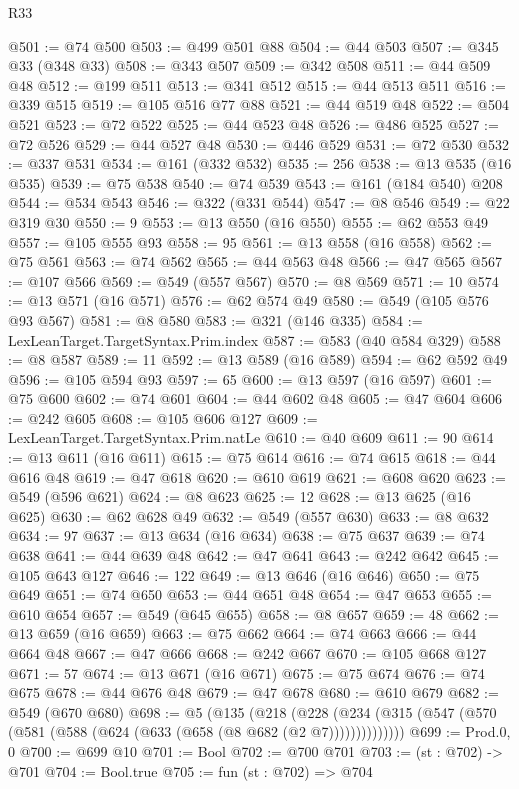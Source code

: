 \begin{lexlean}{R33}
\begin{coremodule}
@501 := @74 @500
@503 := @499 @501 @88
@504 := @44 @503
@507 := @345 @33 (@348 @33)
@508 := @343 @507
@509 := @342 @508
@511 := @44 @509 @48
@512 := @199 @511
@513 := @341 @512
@515 := @44 @513 @511
@516 := @339 @515
@519 := @105 @516 @77 @88
@521 := @44 @519 @48
@522 := @504 @521
@523 := @72 @522
@525 := @44 @523 @48
@526 := @486 @525
@527 := @72 @526
@529 := @44 @527 @48
@530 := @446 @529
@531 := @72 @530
@532 := @337 @531
@534 := @161 (@332 @532)
@535 := 256
@538 := @13 @535 (@16 @535)
@539 := @75 @538
@540 := @74 @539
@543 := @161 (@184 @540) @208
@544 := @534 @543
@546 := @322 (@331 @544)
@547 := @8 @546
@549 := @22 @319 @30
@550 := 9
@553 := @13 @550 (@16 @550)
@555 := @62 @553 @49
@557 := @105 @555 @93
@558 := 95
@561 := @13 @558 (@16 @558)
@562 := @75 @561
@563 := @74 @562
@565 := @44 @563 @48
@566 := @47 @565
@567 := @107 @566
@569 := @549 (@557 @567)
@570 := @8 @569
@571 := 10
@574 := @13 @571 (@16 @571)
@576 := @62 @574 @49
@580 := @549 (@105 @576 @93 @567)
@581 := @8 @580
@583 := @321 (@146 @335)
@584 := LexLeanTarget.TargetSyntax.Prim.index
@587 := @583 (@40 @584 @329)
@588 := @8 @587
@589 := 11
@592 := @13 @589 (@16 @589)
@594 := @62 @592 @49
@596 := @105 @594 @93
@597 := 65
@600 := @13 @597 (@16 @597)
@601 := @75 @600
@602 := @74 @601
@604 := @44 @602 @48
@605 := @47 @604
@606 := @242 @605
@608 := @105 @606 @127
@609 := LexLeanTarget.TargetSyntax.Prim.natLe
@610 := @40 @609
@611 := 90
@614 := @13 @611 (@16 @611)
@615 := @75 @614
@616 := @74 @615
@618 := @44 @616 @48
@619 := @47 @618
@620 := @610 @619
@621 := @608 @620
@623 := @549 (@596 @621)
@624 := @8 @623
@625 := 12
@628 := @13 @625 (@16 @625)
@630 := @62 @628 @49
@632 := @549 (@557 @630)
@633 := @8 @632
@634 := 97
@637 := @13 @634 (@16 @634)
@638 := @75 @637
@639 := @74 @638
@641 := @44 @639 @48
@642 := @47 @641
@643 := @242 @642
@645 := @105 @643 @127
@646 := 122
@649 := @13 @646 (@16 @646)
@650 := @75 @649
@651 := @74 @650
@653 := @44 @651 @48
@654 := @47 @653
@655 := @610 @654
@657 := @549 (@645 @655)
@658 := @8 @657
@659 := 48
@662 := @13 @659 (@16 @659)
@663 := @75 @662
@664 := @74 @663
@666 := @44 @664 @48
@667 := @47 @666
@668 := @242 @667
@670 := @105 @668 @127
@671 := 57
@674 := @13 @671 (@16 @671)
@675 := @75 @674
@676 := @74 @675
@678 := @44 @676 @48
@679 := @47 @678
@680 := @610 @679
@682 := @549 (@670 @680)
@698 := @5
    (@135
      (@218
        (@228 (@234 (@315 (@547 (@570 (@581 (@588 (@624 (@633 (@658 (@8 @682 (@2 @7))))))))))))))
@699 := Prod.{0, 0}
@700 := @699 @10
@701 := Bool
@702 := @700 @701
@703 := (st : @702) -> @701
@704 := Bool.true
@705 := fun (st : @702) => @704

\end{coremodule}
\end{lexlean}
